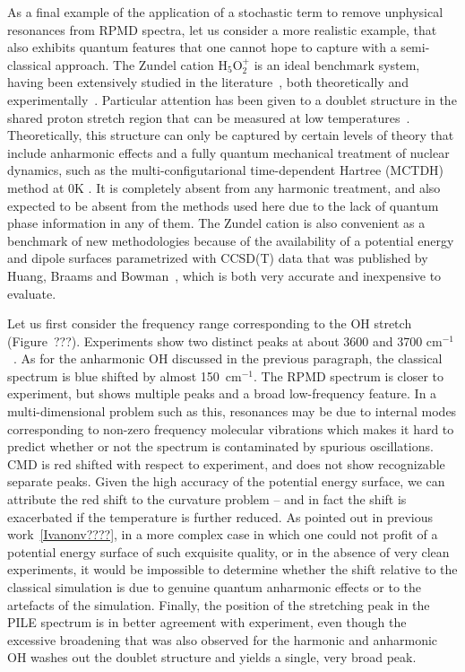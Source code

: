 \documentclass[aps,prb,superscriptaddress,amsmath,amssymb,showpacs,twocolumn]{revtex4}
\begin{document}
As a final example of the application of a stochastic term to remove unphysical resonances 
from RPMD spectra, let us consider a more realistic example, that also exhibits quantum
features that one cannot hope to capture with a semi-classical approach. 
The Zundel cation H$_5$O$_2^+$ is an ideal benchmark system, having been 
extensively studied in the literature~\cite{Schatteburg2008}, both theoretically 
\cite{AgostiniCiccotti2011, ParkKim2007, VenerSauer2001, SauerDoebler2005, ChengKrause1997, VendrellMeyer2007, 
BaerMarxMathias2010, KaledinBowmanJordan2009, HuangBraamsBowman2005} 
and experimentally~\cite{YehLee1989, GuascoJohnson2011, AsmisScience2003, HammerBowmanCarter2005, FridgenMaitre2004}. 
Particular attention has been given to a doublet structure in the 
shared proton stretch region that can be measured
at low temperatures~\cite{GuascoJohnson2011, HammerBowmanCarter2005}.
Theoretically,  this structure can only be captured by certain levels of 
theory that include anharmonic effects and a fully quantum mechanical treatment
of nuclear dynamics, such as the multi-configutarional time-dependent Hartree (MCTDH) method at
0K \cite{VendrellMeyer2007}. It is completely absent from any harmonic treatment,
and also expected to be absent from the methods used here due to the lack
of quantum phase information in any of them.
The Zundel cation is also convenient as a benchmark of new methodologies
because of the availability of a potential energy and dipole surfaces parametrized
with CCSD(T) data that was published by Huang, Braams and Bowman~\cite{HuangBraamsBowman2005},
which is both very accurate and inexpensive to evaluate. 


Let us first consider the frequency range corresponding to the OH stretch (Figure~???). Experiments
show two distinct peaks at about 3600 and 3700 cm$^{-1}$~\cite{YehLee1989}. As for the 
anharmonic OH discussed in the previous paragraph, the classical spectrum is blue shifted by almost 
150~cm$^{-1}$. The RPMD spectrum is closer to experiment, but shows multiple peaks and a broad
low-frequency feature. In a multi-dimensional problem such as this, resonances may be due to 
internal modes corresponding to non-zero frequency molecular vibrations which makes it hard
to predict whether or not the spectrum is contaminated by spurious oscillations. 
CMD is red shifted with respect to experiment, and does not show recognizable separate peaks.
Given the high accuracy of the potential energy surface, we can attribute the red shift to the
curvature problem -- and in fact the shift is exacerbated if the temperature is further reduced. 
As pointed out in previous work~\ref{Ivanonv????}, in a more complex case in which one could not
profit of a potential energy surface of such exquisite quality, or in the absence of very clean 
experiments, it would be impossible to determine whether the shift relative to the classical
simulation is due to genuine quantum anharmonic effects or to the artefacts of the simulation.
Finally, the position of the stretching peak in the PILE spectrum is in better agreement
with experiment, even though the excessive broadening that was also observed for the harmonic and anharmonic
OH washes out the doublet structure and yields a single, very broad peak.
\end{document}
